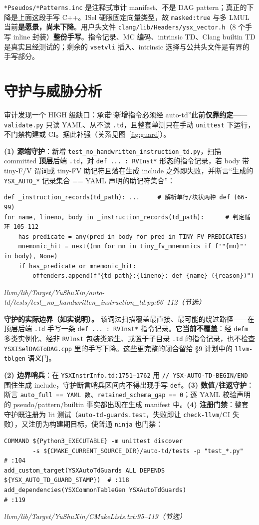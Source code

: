 \documentclass[11pt,UTF8,fontset=none]{ctexart}
\newcommand{\fcite}[1]{{\footnotesize\itshape\textcolor{framegray}{#1}}}
\begin{document}
\texttt{*Pseudos/*Patterns.inc} 是注释式审计 manifest、不是 DAG pattern；真正的下降是上面这段手写 C++。ISel 硬限固定向量类型，故 \texttt{masked:true} 与多 LMUL 当前\textbf{是愿景，尚未下降}。用户头文件 \texttt{clang/lib/Headers/ysx\_vector.h}（8 个手写 inline 封装）\textbf{整份手写}。指令记录、MC 编码、intrinsic TD、Clang builtin TD 是真实且经测试的；剩余的 \texttt{vsetvli} 插入、intrinsic 选择与公共头文件是有界的手写部分。

\section{守护与威胁分析}
审计发现一个 HIGH 级缺口：承诺“新增指令必须经 auto-td”此前\textbf{仅靠约定}——\texttt{validate.py} 只读 YAML、从不读 \texttt{.td}，且整套单测只在手动 \texttt{unittest} 下运行，不门禁构建或 CI。据此补强（关系见图~\ref{fig:guard}）。

\textbf{(1) 源端守护}：新增 \texttt{test\_no\_handwritten\_instruction\_td.py}，扫描 committed \textbf{顶层}后端 \texttt{.td}，对 \texttt{def\ ...\ :\ RVInst*} 形态的指令记录，若 body 带 tiny-F/V 谓词或 tiny-FV 助记符且落在生成 include 之外即失败，并断言“生成的 \texttt{YSX\_AUTO\_*} 记录集合 == YAML 声明的助记符集合”：
\begin{lstlisting}
def _instruction_records(td_path): ...     # 解析单行/块状两种 def (66-99)
for name, lineno, body in _instruction_records(td_path):      # 判定循环 105-112
    has_predicate = any(pred in body for pred in TINY_FV_PREDICATES)
    mnemonic_hit = next((mn for mn in tiny_fv_mnemonics if f'"{mn}"' in body), None)
    if has_predicate or mnemonic_hit:
        offenders.append(f"{td_path}:{lineno}: def {name} ({reason})")
\end{lstlisting}
\fcite{llvm/lib/Target/YuShuXin/auto-td/tests/test\_no\_handwritten\_instruction\_td.py:66--112（节选）}

\textbf{守护的实际边界（如实说明）。} 该词法扫描覆盖最直接、最可能的绕过路径——在顶层后端 \texttt{.td} 手写一条 \texttt{def\ ...\ :\ RVInst*} 指令记录。它\textbf{当前不覆盖}：经 \texttt{defm} 多类实例化、经非 \texttt{RVInst} 包装类派生、或置于子目录 \texttt{.td} 的指令记录，也不检查 \texttt{YSXISelDAGToDAG.cpp} 里的手写下降。这些更完整的闭合留给 §9 计划中的 \texttt{llvm-tblgen} 语义门。

\textbf{(2) 边界哨兵}：在 \texttt{YSXInstrInfo.td:1751--1762} 用 \texttt{// YSX-AUTO-TD-BEGIN/END} 围住生成 include，守护断言哨兵区间内不得出现手写 \texttt{def}。\textbf{(3) 数值/往返守护}：断言 \texttt{auto\_full == YAML 数}、\texttt{retained\_schema\_gap == 0}；逐 YAML 校验声明的 pseudo/pattern/builtin 事实都出现在生成 manifest 中。\textbf{(4) 注册门禁}：整套守护既注册为 lit 测试（\texttt{auto-td-guards.test}，失败即让 \texttt{check-llvm}/CI 失败），又注册为构建期目标，使普通 \texttt{ninja} 也门禁：
\begin{lstlisting}
COMMAND ${Python3_EXECUTABLE} -m unittest discover
        -s ${CMAKE_CURRENT_SOURCE_DIR}/auto-td/tests -p "test_*.py"   # :104
add_custom_target(YSXAutoTdGuards ALL DEPENDS ${YSX_AUTO_TD_GUARD_STAMP})  # :118
add_dependencies(YSXCommonTableGen YSXAutoTdGuards)                         # :119
\end{lstlisting}
\fcite{llvm/lib/Target/YuShuXin/CMakeLists.txt:95--119（节选）}
\end{document}
